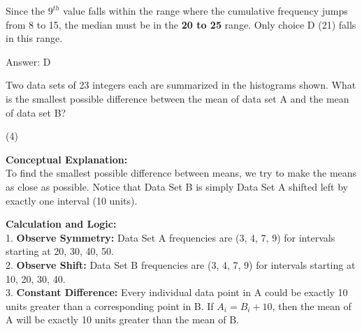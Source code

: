 \documentclass[11pt,paper=a4,answers]{exam}
\begin{document}
\begin{questions}
\begin{solution}
\vspace{20pt}

Since the $9^{th}$ value falls within the range where the cumulative frequency jumps from 8 to 15, the median must be in the \textbf{20 to 25} range. Only choice D (21) falls in this range.

\vspace{30pt}

Answer: \colorbox{yellow!100}{D}
\end{solution}

\vspace{60pt}

\question
\begin{center}
\end{center}
Two data sets of 23 integers each are summarized in the histograms shown. What is the smallest possible difference between the mean of data set A and the mean of data set B?
\begin{tasks}(4)
\end{tasks}

\begin{solution}
\textbf{Conceptual Explanation:} \\
To find the smallest possible difference between means, we try to make the means as close as possible. Notice that Data Set B is simply Data Set A shifted left by exactly one interval (10 units).

\vspace{30pt}

\textbf{Calculation and Logic:} \\
1. \textbf{Observe Symmetry:} Data Set A frequencies are (3, 4, 7, 9) for intervals starting at 20, 30, 40, 50. \\
2. \textbf{Observe Shift:} Data Set B frequencies are (3, 4, 7, 9) for intervals starting at 10, 20, 30, 40. \\
3. \textbf{Constant Difference:} Every individual data point in A could be exactly 10 units greater than a corresponding point in B. If $A_i = B_i + 10$, then the mean of A will be exactly 10 units greater than the mean of B. 


\end{solution}
\end{questions}
\end{document}
